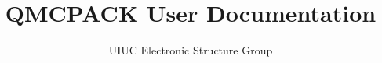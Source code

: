 \documentclass[11pt,letterpaper,fleqn]{report}
\title{QMCPACK User Documentation}
\author{UIUC Electronic Structure Group}
\begin{document}
\maketitle
\tableofcontents
\clearpage
\appendix
\clearpage
\nocite{*}
%
%


\end{document}
